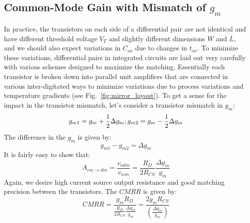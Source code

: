 \subsection{Common-Mode Gain with Mismatch of \texorpdfstring{$g_m$}{Transconductance}}
In practice, the transistors on each side of a differential pair are not identical and have different threshold voltage $V_T$ and slightly different dimensions $W$ and $L$, and we should also expect variations in $C_{ox}$ due to changes in $t_{ox}$.  To minimize these variations, differential pairs in integrated circuits are laid out very carefully with various schemes designed to maximize the matching.  Essentially each transistor is broken down into parallel unit amplifiers that are connected in various inter-digitated ways to minimize variations due to process variations and temperature gradients (see Fig.~\ref{fig:mirror_layout}).
To get a sense for the impact in the transistor mismatch, let's consider a transistor mismatch in $g_m$:
    \begin{equation} 
        {g_{m1}} = {g_m} + \frac{1}{2}\Delta {g_m};{\rm{         }}{g_{m2}} = {g_m} - \frac{1}{2}\Delta {g_m}
    \end{equation}
The difference in the $g_m$ is given by:
    \begin{equation}
        {g_{m1}} - {g_{m2}} = \Delta {g_m}
    \end{equation}
It is fairly easy to show that:
    \begin{equation}
        {A_{cm \to dm }} = \frac{{{v_{odm}}}}{{{v_{icm}}}} = \frac{{{R_D}}}{{2{R_{CS}}}}\frac{{\Delta {g_m}}}{{{g_m}}}
    \end{equation}
Again, we desire high current source output resistance and good matching precision between the transistors.  The $CMRR$ is given by:
    \begin{equation}
        CMRR  =  \frac{{{g_m}{R_D}}}{{\frac{{{R_D}}}{{2{R_{CS}}}}\frac{{\Delta {g_m}}}{{{g_m}}}}} = \frac{{2{g_m}{R_{CS}}}}{{\left( {\frac{{\Delta {g_m}}}{{{g_m}}}} \right)}} 
    \end{equation}
